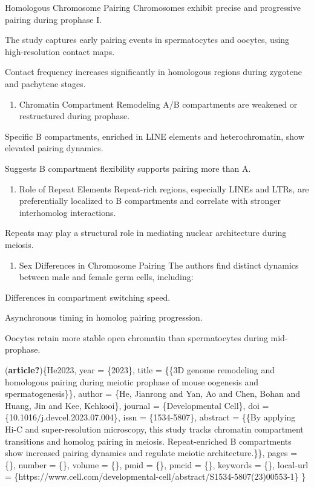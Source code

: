 \documentclass[
  a4paper,
  openany]{scrbook}
\providecommand{\tightlist}{%
  \setlength{\itemsep}{0pt}\setlength{\parskip}{0pt}}
\begin{document}
Homologous Chromosome Pairing Chromosomes exhibit precise and
progressive pairing during prophase I.

The study captures early pairing events in spermatocytes and oocytes,
using high-resolution contact maps.

Contact frequency increases significantly in homologous regions during
zygotene and pachytene stages.

\begin{enumerate}
\def\labelenumi{\arabic{enumi}.}
\setcounter{enumi}{1}
\tightlist
\item
  Chromatin Compartment Remodeling A/B compartments are weakened or
  restructured during prophase.
\end{enumerate}

Specific B compartments, enriched in LINE elements and heterochromatin,
show elevated pairing dynamics.

Suggests B compartment flexibility supports pairing more than A.

\begin{enumerate}
\def\labelenumi{\arabic{enumi}.}
\setcounter{enumi}{2}
\tightlist
\item
  Role of Repeat Elements Repeat-rich regions, especially LINEs and
  LTRs, are preferentially localized to B compartments and correlate
  with stronger interhomolog interactions.
\end{enumerate}

Repeats may play a structural role in mediating nuclear architecture
during meiosis.

\begin{enumerate}
\def\labelenumi{\arabic{enumi}.}
\setcounter{enumi}{3}
\tightlist
\item
  Sex Differences in Chromosome Pairing The authors find distinct
  dynamics between male and female germ cells, including:
\end{enumerate}

Differences in compartment switching speed.

Asynchronous timing in homolog pairing progression.

Oocytes retain more stable open chromatin than spermatocytes during
mid-prophase.

(\textbf{article?})\{He2023, year = \{2023\}, title = \{\{3D genome
remodeling and homologous pairing during meiotic prophase of mouse
oogenesis and spermatogenesis\}\}, author = \{He, Jianrong and Yan, Ao
and Chen, Bohan and Huang, Jin and Kee, Kehkooi\}, journal =
\{Developmental Cell\}, doi = \{10.1016/j.devcel.2023.07.004\}, issn =
\{1534-5807\}, abstract = \{\{By applying Hi-C and super-resolution
microscopy, this study tracks chromatin compartment transitions and
homolog pairing in meiosis. Repeat-enriched B compartments show
increased pairing dynamics and regulate meiotic architecture.\}\}, pages
= \{\}, number = \{\}, volume = \{\}, pmid = \{\}, pmcid = \{\},
keywords = \{\}, local-url =
\{https://www.cell.com/developmental-cell/abstract/S1534-5807(23)00553-1\}
\}
\end{document}
